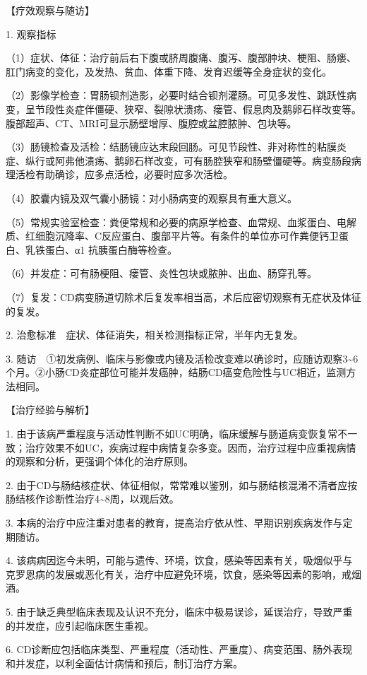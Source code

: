 【疗效观察与随访】

1. 观察指标

（1）症状、体征：治疗前后右下腹或脐周腹痛、腹泻、腹部肿块、梗阻、肠瘘、肛门病变的变化，及发热、贫血、体重下降、发育迟缓等全身症状的变化。

（2）影像学检查：胃肠钡剂造影，必要时结合钡剂灌肠。可见多发性、跳跃性病变，呈节段性炎症伴僵硬、狭窄、裂隙状溃疡、瘘管、假息肉及鹅卵石样改变等。腹部超声、CT、MRI可显示肠壁增厚、腹腔或盆腔脓肿、包块等。

（3）肠镜检查及活检：结肠镜应达末段回肠。可见节段性、非对称性的粘膜炎症、纵行或阿弗他溃疡、鹅卵石样改变，可有肠腔狭窄和肠壁僵硬等。病变肠段病理活检有助确诊，应多点活检，必要时应多次活检。

（4）胶囊内镜及双气囊小肠镜：对小肠病变的观察具有重大意义。

（5）常规实验室检查：粪便常规和必要的病原学检查、血常规、血浆蛋白、电解质、红细胞沉降率、C反应蛋白、腹部平片等。有条件的单位亦可作粪便钙卫蛋白、乳铁蛋白、α{1}
抗胰蛋白酶等检查。

（6）并发症：可有肠梗阻、瘘管、炎性包块或脓肿、出血、肠穿孔等。

（7）复发：CD病变肠道切除术后复发率相当高，术后应密切观察有无症状及体征的复发。

2. 治愈标准　症状、体征消失，相关检测指标正常，半年内无复发。

3.
随访　①初发病例、临床与影像或内镜及活检改变难以确诊时，应随访观察3\textasciitilde{}6个月。②小肠CD炎症部位可能并发癌肿，结肠CD癌变危险性与UC相近，监测方法相同。

【治疗经验与解析】

1.
由于该病严重程度与活动性判断不如UC明确，临床缓解与肠道病变恢复常不一致；治疗效果不如UC，疾病过程中病情复杂多变。因而，治疗过程中应重视病情的观察和分析，更强调个体化的治疗原则。

2.
由于CD与肠结核症状、体征相似，常常难以鉴别，如与肠结核混淆不清者应按肠结核作诊断性治疗4\textasciitilde{}8周，以观后效。

3.
本病的治疗中应注重对患者的教育，提高治疗依从性、早期识别疾病发作与定期随访。

4.
该病病因迄今未明，可能与遗传、环境，饮食，感染等因素有关，吸烟似乎与克罗恩病的发展或恶化有关，治疗中应避免环境，饮食，感染等因素的影响，戒烟酒。

5.
由于缺乏典型临床表现及认识不充分，临床中极易误诊，延误治疗，导致严重的并发症，应引起临床医生重视。

6.
CD诊断应包括临床类型、严重程度（活动性、严重度）、病变范围、肠外表现和并发症，以利全面估计病情和预后，制订治疗方案。

